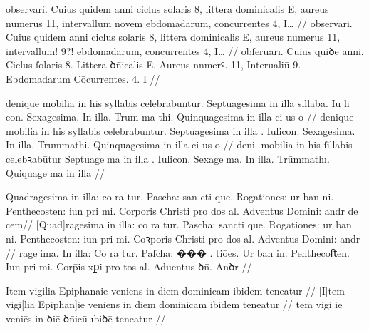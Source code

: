 \ex \bg
\gla
{}
observari. Cuius quidem 
anni ciclus solaris 8, littera dominicalis 
E, aureus numerus 11, intervallum novem {} ebdomadarum, concurrentes 4, 
{I\ldots} {} {}
//
\glRekonstrukcja
{}
observari. Cuius quidem {}
anni ciclus solaris 8, littera dominicalis 
E, aureus numerus 11, intervallum! {} {9?!} ebdomadarum, concurrentes 4, 
{I\ldots} {} {}
//
\glU
{}
obſeruarı. Cuius quiꝺē {} anni. Ciclus ſolaris 8. Littera ꝺn̄icalis E. Aureus nnmerꝰ. 11, Interualiū {} {9}. Ebdomadarum Cōcurrentes. 4. I {} {}
//
\endgl
\eg


\ex \bg
\gla
{}
denique mobilia in his syllabis celebrabuntur. Septuagesima in illa sillaba. {Iu li con}.
Sexagesima. In illa. {Trum ma thi}. Quinquagesima in illa {ci us o}
{} {} {} {}
//
\glRekonstrukcja
{}
denique mobilia in his syllabis celebrabuntur. Septuagesima in illa {}.  Iulicon.
Sexagesima. In illa. Trummathi. Quinquagesima in illa {ci us o}
{} {} {} {}
//
\glU
{}
deni mobilia in his ſillabis celebꝛabūtur Septuagema in illa {}.  Iulicon. Sexagema. In illa. Trūmmathı. Quiquagema in illa
//
\endgl
\eg



\ex \bg
\gla
{}
Quadragesima in illa: co ra tur. Pascha: {san cti} 
que. Rogationes: ur ban ni. Penthecosten: iun pri mi. Corporis Christi pro dos al. Adventus Domini: andr
{de cem}//
\glRekonstrukcja
{}
[Quad]ragesima in illa: co ra tur. Pascha: {sancti} 
que. Rogationes: ur ban ni. Penthecosten: iun pri mi. Coꝛporis Christi pro dos al. Adventus Domini: andr
{} {}
//
\glU
{}
rageima. In illa: Co ra tur. Paſcha: ��� . tiōes. Ur ban in. Penthecoﬅen. Iun pri mi. Corp̄is xꝑi pro tos al. Aduentus ꝺn̄. Anꝺr
//
\endgl
\eg



\ex \bg
\gla
{}
Item
vigilia Epiphanaie veniens
in diem dominicam ibidem 
teneatur
//
\glRekonstrukcja
{}
[I]tem
vigi[lia Epiphan]ie veniens
in diem dominicam ibidem 
teneatur
//
\glU
{}
tem vigi ie veniēs in ꝺiē ꝺn̄icū ıbiꝺē teneatur
//
\endgl
\eg




